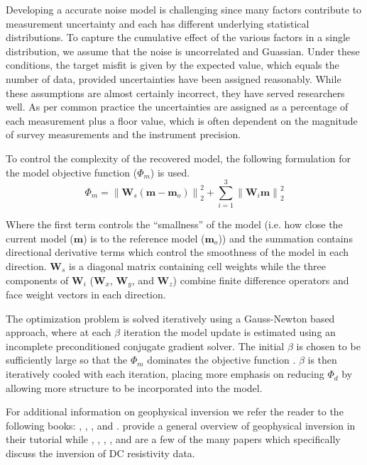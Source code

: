 \documentclass[final,authoryear,5p,times,twocolumn]{elsarticle}
\begin{document}
Developing a accurate noise model is challenging since many factors contribute to measurement uncertainty and each has different underlying statistical distributions. To capture the cumulative effect of the various factors in a single distribution, we assume that the noise is uncorrelated and Guassian. Under these conditions, the target misfit is given by the expected value, which equals the number of data, provided uncertainties have been assigned reasonably. While these assumptions are almost certainly incorrect, they have served researchers well. As per common practice the uncertainties are assigned as a percentage of each measurement plus a floor value, which is often dependent on the magnitude of survey measurements and the instrument precision.

To control the complexity of the recovered model, the following formulation for the model objective function ($\Phi_{m}$) is used.
\begin{equation}
\label{eq:modobjdiscr}
\Phi_m = \left\|\mathbf{W}_s(\mathbf{m}-\mathbf{m}_o)\right\|_2^2 + \sum^{3}_{i=1}\left\|\mathbf{W}_i\mathbf{m}\right\|_2^2
\end{equation} 

Where the first term controls the ``smallness'' of the model (i.e. how close the current model ($\mathbf{m}$) is to the reference model ($\mathbf{m}_o$)) and the summation contains directional derivative terms which control the smoothness of the model in each direction. $\mathbf{W}_s$ is a diagonal matrix containing cell weights while the three components of $\mathbf{W}_i$ ($\mathbf{W}_x$, $\mathbf{W}_y$, and $\mathbf{W}_z$) combine finite difference operators and face weight vectors in each direction. 

The optimization problem is solved iteratively using a Gauss-Newton based approach, where at each $\beta$ iteration the model update is estimated using an incomplete preconditioned conjugate gradient solver. The initial $\beta$ is chosen to be sufficiently large so that the $\Phi_m$ dominates the objective function \citep{Haber2004}.  $\beta$ is then iteratively cooled with each iteration, placing more emphasis on reducing $\Phi_d$ by allowing more structure to be incorporated into the model.

For additional information on geophysical inversion we refer the reader to the following books: \cite{Menke1989}, \cite{Parker1994}, \cite{Aster2012}, and \cite{Haber2014}. \cite{Oldenburg2005} provide a general overview of geophysical inversion in their tutorial while \cite{Li1994}, \cite{LaBrecque1996}, \cite{Loke1996}, \cite{Ramirez1996}, and \cite{Loke2013} are a few of the many papers which specifically discuss the inversion of DC resistivity data.
\end{document}
